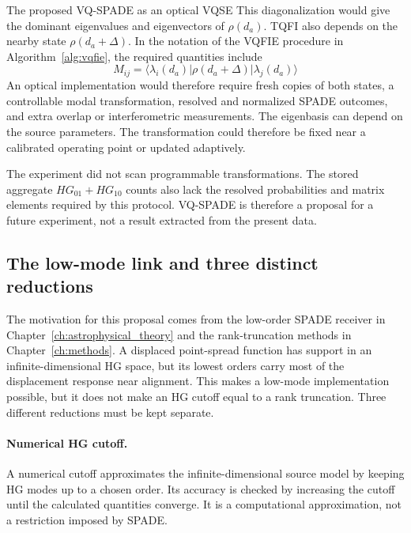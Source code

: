 \begin{infobox}{The proposed VQ-SPADE as an optical VQSE}
    This diagonalization would give the dominant eigenvalues and eigenvectors of $\rho(d_a)$.  TQFI also depends on the nearby state $\rho(d_a+\Delta)$.  In the notation of the VQFIE procedure in Algorithm~\ref{alg:vqfie}, the required quantities include
    \begin{equation}
        M_{ij}
        =\langle\lambda_i(d_a)|\rho(d_a+\Delta)|\lambda_j(d_a)\rangle
        \label{eq:spade_tqfi_required_overlaps}
    \end{equation}
    An optical implementation would therefore require fresh copies of both states, a controllable modal transformation, resolved and normalized SPADE outcomes, and extra overlap or interferometric measurements.  The eigenbasis can depend on the source parameters.  The transformation could therefore be fixed near a calibrated operating point or updated adaptively.

    The experiment did not scan programmable transformations.  The stored aggregate $HG_{01}+HG_{10}$ counts also lack the resolved probabilities and matrix elements required by this protocol.  VQ-SPADE is therefore a proposal for a future experiment, not a result extracted from the present data.
\end{infobox}

\subsection{The low-mode link and three distinct reductions}

The motivation for this proposal comes from the low-order SPADE receiver in Chapter~\ref{ch:astrophysical_theory} and the rank-truncation methods in Chapter~\ref{ch:methods}.  A displaced point-spread function has support in an infinite-dimensional HG space, but its lowest orders carry most of the displacement response near alignment.  This makes a low-mode implementation possible, but it does not make an HG cutoff equal to a rank truncation.  Three different reductions must be kept separate.

\paragraph{Numerical HG cutoff.}
A numerical cutoff approximates the infinite-dimensional source model by keeping HG modes up to a chosen order.  Its accuracy is checked by increasing the cutoff until the calculated quantities converge.  It is a computational approximation, not a restriction imposed by SPADE.

